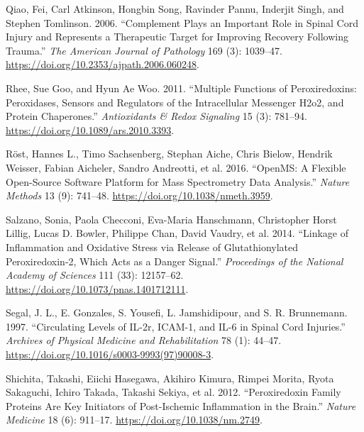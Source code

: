 \documentclass[9pt,lineno]{elife}
\newlength{\cslhangindent}
\newlength{\cslentryspacingunit} %
\newenvironment{CSLReferences}[2] %
 {%
  \setlength{\parindent}{0pt}
  \ifodd #1
  \let\oldpar\par
  \def\par{\hangindent=\cslhangindent\oldpar}
  \fi
  \setlength{\parskip}{#2\cslentryspacingunit}
 }%
 {}
\begin{document}
\begin{landscape}
\begin{landscape}
\begin{landscape}
\begin{landscape}
\begin{CSLReferences}{1}{0}
\leavevmode{}%
Qiao, Fei, Carl Atkinson, Hongbin Song, Ravinder Pannu, Inderjit Singh, and Stephen Tomlinson. 2006. {``Complement {Plays} an {Important Role} in {Spinal Cord Injury} and {Represents} a {Therapeutic Target} for {Improving Recovery} Following {Trauma}.''} \emph{The American Journal of Pathology} 169 (3): 1039--47. \url{https://doi.org/10.2353/ajpath.2006.060248}.

\leavevmode{}%
Rhee, Sue Goo, and Hyun Ae Woo. 2011. {``Multiple {Functions} of {Peroxiredoxins}: {Peroxidases}, {Sensors} and {Regulators} of the {Intracellular Messenger H2o2}, and {Protein Chaperones}.''} \emph{Antioxidants \& Redox Signaling} 15 (3): 781--94. \url{https://doi.org/10.1089/ars.2010.3393}.

\leavevmode{}%
Röst, Hannes L., Timo Sachsenberg, Stephan Aiche, Chris Bielow, Hendrik Weisser, Fabian Aicheler, Sandro Andreotti, et al. 2016. {``{OpenMS}: A Flexible Open-Source Software Platform for Mass Spectrometry Data Analysis.''} \emph{Nature Methods} 13 (9): 741--48. \url{https://doi.org/10.1038/nmeth.3959}.

\leavevmode{}%
Salzano, Sonia, Paola Checconi, Eva-Maria Hanschmann, Christopher Horst Lillig, Lucas D. Bowler, Philippe Chan, David Vaudry, et al. 2014. {``Linkage of Inflammation and Oxidative Stress via Release of Glutathionylated Peroxiredoxin-2, Which Acts as a Danger Signal.''} \emph{Proceedings of the National Academy of Sciences} 111 (33): 12157--62. \url{https://doi.org/10.1073/pnas.1401712111}.

\leavevmode{}%
Segal, J. L., E. Gonzales, S. Yousefi, L. Jamshidipour, and S. R. Brunnemann. 1997. {``Circulating Levels of {IL-2r}, {ICAM-1}, and {IL-6} in Spinal Cord Injuries.''} \emph{Archives of Physical Medicine and Rehabilitation} 78 (1): 44--47. \url{https://doi.org/10.1016/s0003-9993(97)90008-3}.

\leavevmode{}%
Shichita, Takashi, Eiichi Hasegawa, Akihiro Kimura, Rimpei Morita, Ryota Sakaguchi, Ichiro Takada, Takashi Sekiya, et al. 2012. {``Peroxiredoxin Family Proteins Are Key Initiators of Post-Ischemic Inflammation in the Brain.''} \emph{Nature Medicine} 18 (6): 911--17. \url{https://doi.org/10.1038/nm.2749}.


\end{CSLReferences}
\end{landscape}
\end{landscape}
\end{landscape}
\end{landscape}
\end{document}
